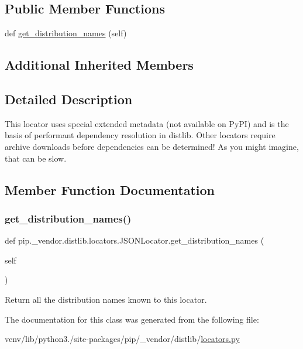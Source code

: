 \subsection*{Public Member Functions}
\begin{DoxyCompactItemize}
\item 
def \hyperlink{classpip_1_1__vendor_1_1distlib_1_1locators_1_1JSONLocator_ae5a4f0ca7bc71e4634d30e22d77bab4b}{get\+\_\+distribution\+\_\+names} (self)
\end{DoxyCompactItemize}
\subsection*{Additional Inherited Members}


\subsection{Detailed Description}
\begin{DoxyVerb}This locator uses special extended metadata (not available on PyPI) and is
the basis of performant dependency resolution in distlib. Other locators
require archive downloads before dependencies can be determined! As you
might imagine, that can be slow.
\end{DoxyVerb}
 

\subsection{Member Function Documentation}
\mbox{\label{classpip_1_1__vendor_1_1distlib_1_1locators_1_1JSONLocator_ae5a4f0ca7bc71e4634d30e22d77bab4b}} 
\subsubsection{\texorpdfstring{get\+\_\+distribution\+\_\+names()}{get\_distribution\_names()}}
{\footnotesize\ttfamily def pip.\+\_\+vendor.\+distlib.\+locators.\+J\+S\+O\+N\+Locator.\+get\+\_\+distribution\+\_\+names (\begin{DoxyParamCaption}\item[{}]{self }\end{DoxyParamCaption})}

\begin{DoxyVerb}Return all the distribution names known to this locator.
\end{DoxyVerb}
 

The documentation for this class was generated from the following file\+:\begin{DoxyCompactItemize}
\item 
venv/lib/python3./site-\/packages/pip/\+\_\+vendor/distlib/\hyperlink{locators_8py}{locators.\+py}\end{DoxyCompactItemize}
